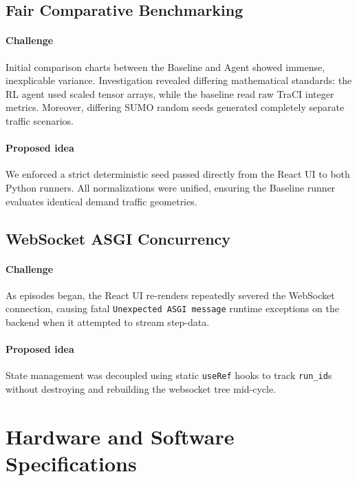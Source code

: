 \documentclass[12pt, onecolumn]{IEEEtran}
\begin{document}
\subsection{Fair Comparative Benchmarking}
\paragraph{Challenge} Initial comparison charts between the Baseline and Agent showed immense, inexplicable variance. Investigation revealed differing mathematical standards: the RL agent used scaled tensor arrays, while the baseline read raw TraCI integer metrics. Moreover, differing SUMO random seeds generated completely separate traffic scenarios. \\
\paragraph{Proposed idea} We enforced a strict deterministic seed passed directly from the React UI to both Python runners. All normalizations were unified, ensuring the Baseline runner evaluates identical demand traffic geometries.

\subsection{WebSocket ASGI Concurrency}
\paragraph{Challenge} As episodes began, the React UI re-renders repeatedly severed the WebSocket connection, causing fatal \texttt{Unexpected ASGI message} runtime exceptions on the backend when it attempted to stream step-data. \\
\paragraph{Proposed idea} State management was decoupled using static \texttt{useRef} hooks to track \texttt{run\_id}s without destroying and rebuilding the websocket tree mid-cycle.

\section{Hardware and Software Specifications}
\end{document}
